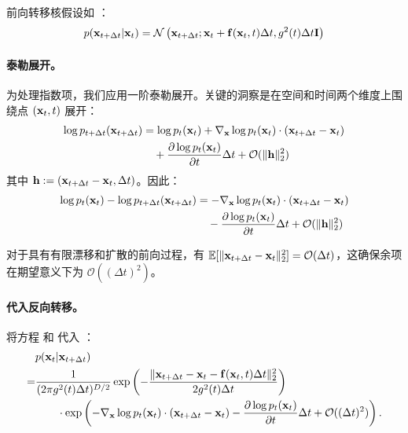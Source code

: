 前向转移核假设如 ：
\begin{equation*}
p({\mathbf{x}}_{t+\Delta t} | {\mathbf{x}}_t) = \mathcal{N}\left({\mathbf{x}}_{t+\Delta t}; {\mathbf{x}}_t + {\mathbf{f}}({\mathbf{x}}_t, t)\Delta t, g^2(t)\Delta t \mathbf{I}\right)
\end{equation*}

\paragraph{泰勒展开。}
为处理指数项，我们应用一阶泰勒展开。关键的洞察是在空间和时间两个维度上围绕点 $({\mathbf{x}}_t, t)$ 展开：
\begin{align*}
    \log p_{t+\Delta t}({\mathbf{x}}_{t+\Delta t}) &= \log p_t({\mathbf{x}}_t) + \nabla_{{\mathbf{x}}} \log p_t({\mathbf{x}}_t) \cdot ({\mathbf{x}}_{t+\Delta t} - {\mathbf{x}}_t) \nonumber \\
    &\quad + \frac{\partial \log p_t({\mathbf{x}}_t)}{\partial t} \Delta t + \mathcal{O}(\|{\mathbf{h}}\|_2^2) 
\end{align*}
其中 ${\mathbf{h}} := ({\mathbf{x}}_{t+\Delta t} - {\mathbf{x}}_t, \Delta t)$。因此：
\begin{align}
    \log p_t({\mathbf{x}}_t) - \log p_{t+\Delta t}({\mathbf{x}}_{t+\Delta t}) &= -\nabla_{{\mathbf{x}}} \log p_t({\mathbf{x}}_t) \cdot ({\mathbf{x}}_{t+\Delta t} - {\mathbf{x}}_t) \nonumber \\
    &\quad - \frac{\partial \log p_t({\mathbf{x}}_t)}{\partial t} \Delta t + \mathcal{O}(\|{\mathbf{h}}\|_2^2) \label{eq:log-difference}
\end{align}

对于具有有限漂移和扩散的前向过程，有 $\mathbb{E}[\|{\mathbf{x}}_{t+\Delta t} - {\mathbf{x}}_t\|_2^2] = \mathcal{O}(\Delta t)$，这确保余项在期望意义下为 $\mathcal{O}((\Delta t)^2)$。

\paragraph{代入反向转移。}
将方程  和  代入 ：
\begin{align*}
    &p({\mathbf{x}}_t | {\mathbf{x}}_{t+\Delta t}) \nonumber \\
    = &\frac{1}{(2\pi g^2(t) \Delta t)^{D/2}} \exp\left(-\frac{\|{\mathbf{x}}_{t+\Delta t} - {\mathbf{x}}_t - {\mathbf{f}}({\mathbf{x}}_t, t) \Delta t\|_2^2}{2 g^2(t) \Delta t}\right) \nonumber \\
    &\qquad \cdot \exp\left(-\nabla_{{\mathbf{x}}} \log p_t({\mathbf{x}}_t) \cdot ({\mathbf{x}}_{t+\Delta t} - {\mathbf{x}}_t) - \frac{\partial \log p_t({\mathbf{x}}_t)}{\partial t} \Delta t + \mathcal{O}((\Delta t)^2)\right). 
\end{align*}
